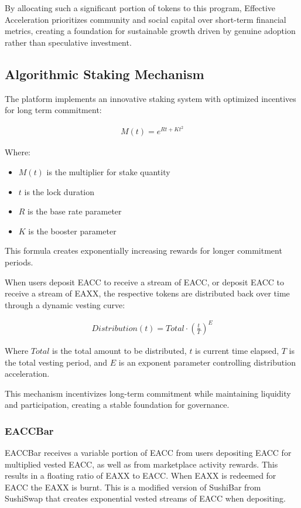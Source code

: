 \documentclass{article}
\begin{document}
By allocating such a significant portion of tokens to this program, Effective Acceleration prioritizes community and social capital over short-term financial metrics, creating a foundation for sustainable growth driven by genuine adoption rather than speculative investment.

\subsection{Algorithmic Staking Mechanism}

The platform implements an innovative staking system with optimized incentives for long term commitment:

\begin{align}
M(t) = e^{Rt + Kt^2}
\end{align}

Where:
\begin{itemize}
    \item $M(t)$ is the multiplier for stake quantity
    \item $t$ is the lock duration
    \item $R$ is the base rate parameter
    \item $K$ is the booster parameter
\end{itemize}

This formula creates exponentially increasing rewards for longer commitment periods.

When users deposit EACC to receive a stream of EACC, or deposit EACC to receive a stream of EAXX, the respective tokens are distributed back over time through a dynamic vesting curve:

\begin{align}
Distribution(t) = Total \cdot \left(\frac{t}{T}\right)^E
\end{align}

Where $Total$ is the total amount to be distributed, $t$ is current time elapsed, $T$ is the total vesting period, and $E$ is an exponent parameter controlling distribution acceleration.

This mechanism incentivizes long-term commitment while maintaining liquidity and participation, creating a stable foundation for governance.

\subsubsection{EACCBar}

EACCBar receives a variable portion of EACC from users depositing EACC for multiplied vested EACC, as well as from marketplace activity rewards. This results in a floating ratio of EAXX to EACC. When EAXX is redeemed for EACC the EAXX is burnt. This is a modified version of SushiBar from SushiSwap that creates exponential vested streams of EACC when depositing.
\end{document}

